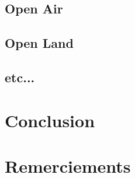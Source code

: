 \documentclass[10pt, conference, compsocconf]{llncs}
\begin{document}
	\subsection{Open Air}
	\subsection{Open Land}
	\subsection{etc...}

\section{Conclusion}\label{sec:conclusion}

\section*{Remerciements}




\end{document}

